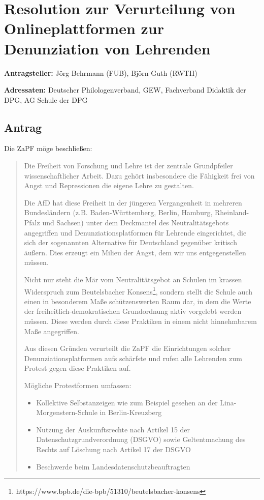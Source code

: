 \documentclass[draft,10pt,oneside]{scrartcl}
\begin{document}
\section*{Resolution zur Verurteilung von Onlineplattformen zur Denunziation
von Lehrenden}

\textbf{Antragsteller:} Jörg Behrmann (FUB), Björn Guth (RWTH)

\textbf{Adressaten:} Deutscher Philologenverband, GEW, Fachverband Didaktik der
DPG, AG Schule der DPG

\subsection*{Antrag}

Die ZaPF möge beschließen:

\begin{quote} Die Freiheit von Forschung und Lehre ist der zentrale
    Grundpfeiler wissenschaftlicher Arbeit. Dazu gehört insbesondere die
    Fähigkeit frei von Angst und Repressionen die eigene Lehre zu gestalten.

    Die AfD hat diese Freiheit in der jüngeren Vergangenheit in mehreren
    Bundesländern (z.B. Ba\-den-\allowbreak Würt\-tem\-berg, Berlin, Hamburg,
    Rheinland-Pfalz und Sachsen) unter dem Deckmantel des Neutralitätsgebots
    angegriffen und Denunziationsplatformen für Lehrende eingerichtet, die sich
    der sogenannten \glqq{}Alternative für Deutschland\grqq{} gegenüber
    kritisch äußern. Dies erzeugt ein Milieu der Angst, dem wir uns
    entgegenstellen müssen.

    Nicht nur steht die Mär vom Neutralitätsgebot an Schulen im krassen
    Widerspruch zum Beutelsbacher
    Konsens\footnote{https://www.bpb.de/die-bpb/51310/beutelsbacher-konsens},
    sondern stellt  die Schule auch einen in besonderem Maße schützenswerten
    Raum dar, in dem die Werte der freiheitlich-demokratischen Grundordnung
    aktiv vorgelebt werden müssen. Diese werden durch diese Praktiken in einem
    nicht hinnehmbarem Maße angegriffen.

    Aus diesen Gründen verurteilt die ZaPF die Einrichtungen solcher
    Denunziationsplatformen aufs schärfste und rufen alle Lehrenden zum Protest
    gegen diese Praktiken auf.

    Mögliche Protestformen umfassen:

    \begin{itemize}
        \item Kollektive Selbstanzeigen wie zum Beispiel gesehen an der
            Lina-\allowbreak Morgenstern-\allowbreak Schule in
            Ber\-lin-\allowbreak Kreuz\-berg
        \item Nutzung der Auskunftsrechte nach Artikel 15 der
            Datenschutzgrundverordnung (DSGVO) sowie Geltentmachung des Rechts
            auf Löschung nach Artikel 17 der DSGVO
        \item Beschwerde beim Landesdatenschutzbeauftragten
    \end{itemize}
\end{quote}
\end{document}
